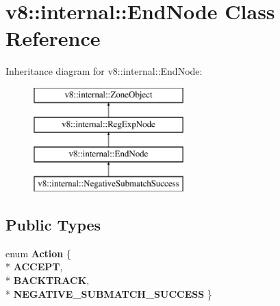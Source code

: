 \hypertarget{classv8_1_1internal_1_1_end_node}{}\section{v8\+:\+:internal\+:\+:End\+Node Class Reference}
\label{classv8_1_1internal_1_1_end_node}
Inheritance diagram for v8\+:\+:internal\+:\+:End\+Node\+:\begin{figure}[H]
\begin{center}
\leavevmode
\includegraphics[height=4.000000cm]{classv8_1_1internal_1_1_end_node}
\end{center}
\end{figure}
\subsection*{Public Types}
\begin{DoxyCompactItemize}
\item 
enum {\bfseries Action} \{ \\*
{\bfseries A\+C\+C\+E\+PT}, 
\\*
{\bfseries B\+A\+C\+K\+T\+R\+A\+CK}, 
\\*
{\bfseries N\+E\+G\+A\+T\+I\+V\+E\+\_\+\+S\+U\+B\+M\+A\+T\+C\+H\+\_\+\+S\+U\+C\+C\+E\+SS}
 \}\hypertarget{classv8_1_1internal_1_1_end_node_abac30d22b1fc00be81e100180e4ca83a}{}\label{classv8_1_1internal_1_1_end_node_abac30d22b1fc00be81e100180e4ca83a}

\end{DoxyCompactItemize}
